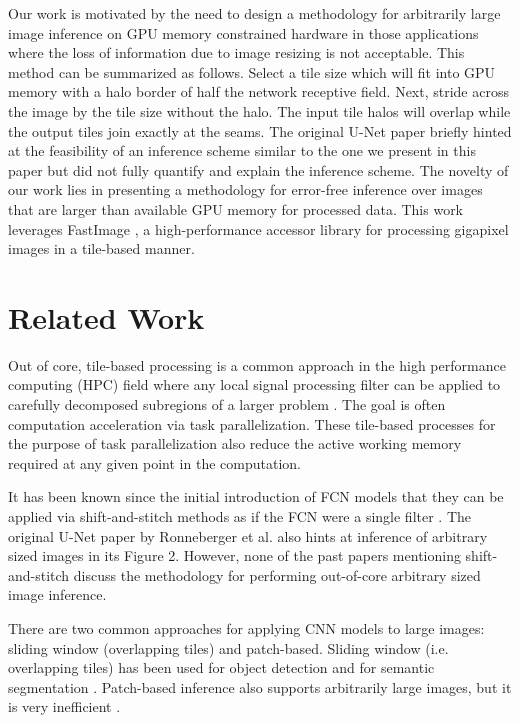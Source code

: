 \documentclass[runningheads]{llncs}
\begin{document}
Our work is motivated by the need to design a methodology for arbitrarily large image inference on GPU memory constrained hardware in those applications where the loss of information due to image resizing is not acceptable. This method can be summarized as follows. Select a tile size which will fit into GPU memory with a halo border of half the network receptive field. Next, stride across the image by the tile size without the halo. The input tile halos will overlap while the output tiles join exactly at the seams. 
The original U-Net paper \cite{Ronneberger2015a} briefly hinted at the feasibility of an inference scheme similar to the one we present in this paper but did not fully quantify and explain the inference scheme. 
The novelty of our work lies in presenting a methodology for error-free inference over images that are larger than available GPU memory for processed data. This work leverages FastImage \cite{Bardakoff2019}, a high-performance accessor library for processing gigapixel images in a tile-based manner.

\section{Related Work}
\label{related-work}

Out of core, tile-based processing is a common approach in the high performance computing (HPC) field where any local signal processing filter can be applied to carefully decomposed subregions of a larger problem \cite{Blattner2017}. The goal is often computation acceleration via task parallelization. These tile-based processes for the purpose of task parallelization also reduce the active working memory required at any given point in the computation.

It has been known since the initial introduction of FCN models that they can be applied via shift-and-stitch methods as if the FCN were a single filter \cite{Long2015,Sherrah2016}.
The original U-Net paper by Ronneberger et al. \cite{Ronneberger2015a} also hints at inference of arbitrary sized images in its Figure 2. However, none of the past papers mentioning shift-and-stitch discuss the methodology for performing out-of-core arbitrary sized image inference.

There are two common approaches for applying CNN models to large images: sliding window (overlapping tiles) and patch-based. Sliding window (i.e. overlapping tiles) has been used for object detection \cite{Sermanet2013,VanEtten2019} and for semantic segmentation \cite{Lin2019,Volpi2017a}. Patch-based inference also supports arbitrarily large images, but it is very inefficient \cite{Volpi2017a,Maggiori2016}.
\end{document}
